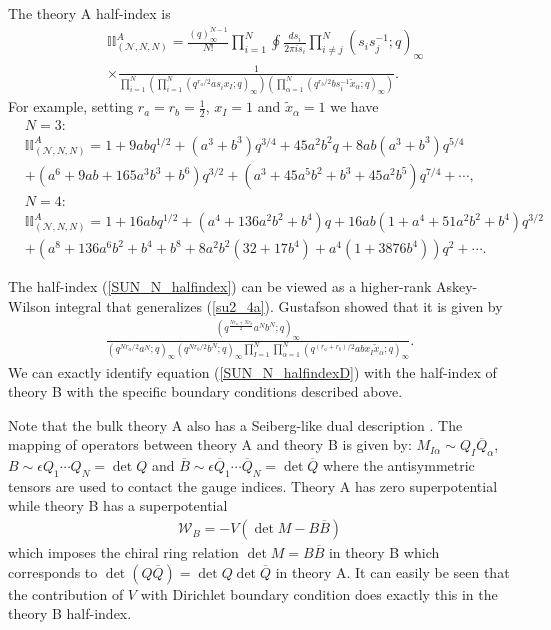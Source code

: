 \documentclass[12pt]{article}
\newcommand{\Wcal}{\mathcal{W}}
\numberwithin{equation}{section}
\begin{document}
The theory A half-index is 
\begin{align}
\label{SUN_N_halfindex}
&
\mathbb{II}_{(\mathcal{N},N,N)}^A
=
\frac{(q)_{\infty}^{N-1}}{N!} \prod_{i=1}^N \oint \frac{ds_i}{2\pi i s_i}
\prod_{i \ne j}^N (s_i s_j^{-1}; q)_{\infty}
\nonumber\\
&\times 
\frac{1}{\prod_{i = 1}^N \left( \prod_{i = 1}^N (q^{r_a/2} a s_i x_I; q)_{\infty} \right) \left( \prod_{\alpha = 1}^{N} (q^{r_b/2} b s_i^{-1} \tilde{x}_{\alpha}; q)_{\infty} \right)}. 
\end{align}
For example, setting $r_a=r_b=\frac12$, $x_I = 1$ and $\tilde{x}_{\alpha} = 1$ we have
\begin{align}
&N=3: 
\nonumber\\
&\mathbb{II}_{(\mathcal{N},N,N)}^A=
1+9abq^{1/2}+(a^3+b^3)q^{3/4}
+45a^2b^2q+8ab(a^3+b^3)q^{5/4}
\nonumber\\
&+(a^6+9ab+165a^3b^3+b^6)q^{3/2}+(a^3+45a^5b^2+b^3+45a^2b^5)q^{7/4}+\cdots
,\\
&N=4: 
\nonumber\\
&\mathbb{II}_{(\mathcal{N},N,N)}^A=
1+16abq^{1/2}+(a^4+136a^2b^2+b^4)q+16ab(1+a^4+51a^2 b^2+ b^4)q^{3/2}
\nonumber\\
&+(a^8+136a^6b^2+b^4+b^8+8a^2b^2(32+17b^4)+a^4(1+3876b^4))q^2+\cdots.
\end{align}

The half-index (\ref{SUN_N_halfindex}) can be viewed as a higher-rank Askey-Wilson integral that generalizes (\ref{su2_4a}). 
Gustafson \cite{MR1139492} showed that it is given by
\begin{align}
\label{SUN_N_halfindexD}
\frac{\left( q^\frac{Nr_a+Nr_b}{2} a^N b^N; q \right)_{\infty}}{\left( q^{Nr_a/2} a^N; q \right)_{\infty} \left( q^{Nr_b/2} b^N; q \right)_{\infty} \prod_{I = 1}^N \prod_{\alpha = 1}^{N} (q^{(r_a + r_b)/2} ab x_I \tilde{x}_{\alpha}; q)_{\infty}}. 
\end{align}
We can exactly identify equation (\ref{SUN_N_halfindexD}) with the half-index of theory B with the specific boundary conditions described above.

Note that the bulk theory A also has a Seiberg-like dual description \cite{Aharony:2013dha,Park:2013wta}. 
The mapping of operators between theory A and theory B is given by:
$M_{I \alpha} \sim Q_I \overline{Q}_{\alpha}$, $B \sim \epsilon Q_{1} \cdots Q_{N} = \det Q$ and
$\overline{B} \sim \epsilon \overline{Q}_1 \cdots \overline{Q}_N = \det \overline{Q}$ where the antisymmetric tensors are used to contact the gauge indices. 
Theory A has zero superpotential while theory B has a superpotential
\begin{align}
\label{SUN_N_B_superpot}
\Wcal_B = -V \left( \det M - B \overline{B} \right)
\end{align}
which imposes the chiral ring relation $\det M = B \overline{B}$ in theory B which corresponds to
$\det (Q \overline{Q}) = \det Q \det \overline{Q}$ in theory A. It can easily be seen that the
contribution of $V$ with Dirichlet boundary condition does exactly this in the theory B half-index. 
\end{document}
